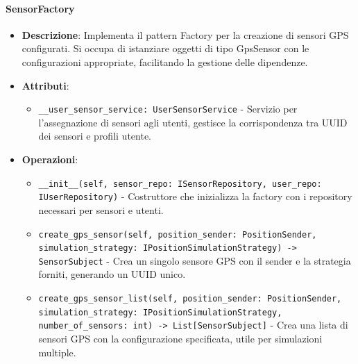 \documentclass[10pt]{article}
\begin{document}

    \paragraph{SensorFactory}
    \begin{itemize}
        \item \textbf{Descrizione}: Implementa il pattern Factory per la creazione di sensori GPS configurati. Si occupa di istanziare oggetti di tipo GpsSensor con le configurazioni appropriate, facilitando la gestione delle dipendenze.
        \item \textbf{Attributi}:
        \begin{itemize}
            \item \texttt{\_\_user\_sensor\_service: UserSensorService} - Servizio per l'assegnazione di sensori agli utenti, gestisce la corrispondenza tra UUID dei sensori e profili utente.
        \end{itemize}
        \item \textbf{Operazioni}:
        \begin{itemize}
            \item \texttt{\_\_init\_\_(self, sensor\_repo: ISensorRepository, user\_repo: IUserRepository)} - Costruttore che inizializza la factory con i repository necessari per sensori e utenti.
            \item \texttt{create\_gps\_sensor(self, position\_sender: PositionSender, simulation\_strategy: IPositionSimulationStrategy) -> SensorSubject} - Crea un singolo sensore GPS con il sender e la strategia forniti, generando un UUID unico.
            \item \texttt{create\_gps\_sensor\_list(self, position\_sender: PositionSender, simulation\_strategy: IPositionSimulationStrategy, number\_of\_sensors: int) -> List[SensorSubject]} - Crea una lista di sensori GPS con la configurazione specificata, utile per simulazioni multiple.
        \end{itemize}
    \end{itemize}
\end{document}

